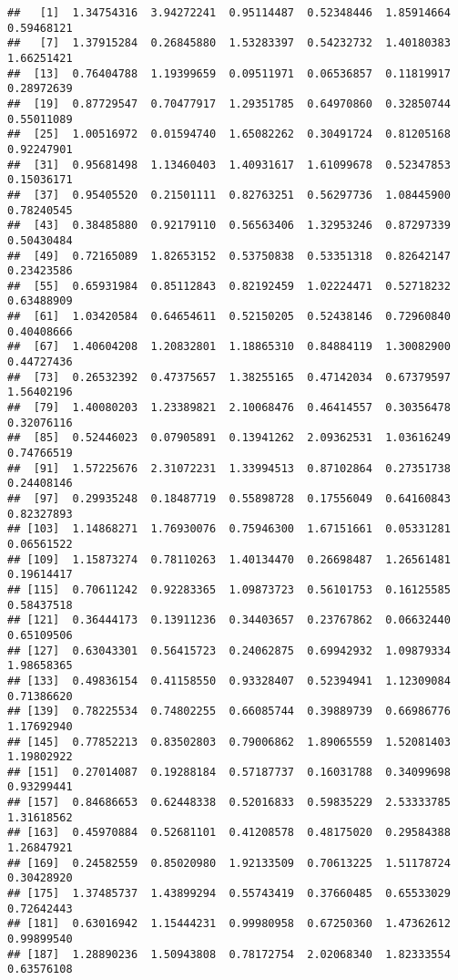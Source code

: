 \documentclass[
]{article}
\begin{document}
\begin{verbatim}
##   [1]  1.34754316  3.94272241  0.95114487  0.52348446  1.85914664  0.59468121
##   [7]  1.37915284  0.26845880  1.53283397  0.54232732  1.40180383  1.66251421
##  [13]  0.76404788  1.19399659  0.09511971  0.06536857  0.11819917  0.28972639
##  [19]  0.87729547  0.70477917  1.29351785  0.64970860  0.32850744  0.55011089
##  [25]  1.00516972  0.01594740  1.65082262  0.30491724  0.81205168  0.92247901
##  [31]  0.95681498  1.13460403  1.40931617  1.61099678  0.52347853  0.15036171
##  [37]  0.95405520  0.21501111  0.82763251  0.56297736  1.08445900  0.78240545
##  [43]  0.38485880  0.92179110  0.56563406  1.32953246  0.87297339  0.50430484
##  [49]  0.72165089  1.82653152  0.53750838  0.53351318  0.82642147  0.23423586
##  [55]  0.65931984  0.85112843  0.82192459  1.02224471  0.52718232  0.63488909
##  [61]  1.03420584  0.64654611  0.52150205  0.52438146  0.72960840  0.40408666
##  [67]  1.40604208  1.20832801  1.18865310  0.84884119  1.30082900  0.44727436
##  [73]  0.26532392  0.47375657  1.38255165  0.47142034  0.67379597  1.56402196
##  [79]  1.40080203  1.23389821  2.10068476  0.46414557  0.30356478  0.32076116
##  [85]  0.52446023  0.07905891  0.13941262  2.09362531  1.03616249  0.74766519
##  [91]  1.57225676  2.31072231  1.33994513  0.87102864  0.27351738  0.24408146
##  [97]  0.29935248  0.18487719  0.55898728  0.17556049  0.64160843  0.82327893
## [103]  1.14868271  1.76930076  0.75946300  1.67151661  0.05331281  0.06561522
## [109]  1.15873274  0.78110263  1.40134470  0.26698487  1.26561481  0.19614417
## [115]  0.70611242  0.92283365  1.09873723  0.56101753  0.16125585  0.58437518
## [121]  0.36444173  0.13911236  0.34403657  0.23767862  0.06632440  0.65109506
## [127]  0.63043301  0.56415723  0.24062875  0.69942932  1.09879334  1.98658365
## [133]  0.49836154  0.41158550  0.93328407  0.52394941  1.12309084  0.71386620
## [139]  0.78225534  0.74802255  0.66085744  0.39889739  0.66986776  1.17692940
## [145]  0.77852213  0.83502803  0.79006862  1.89065559  1.52081403  1.19802922
## [151]  0.27014087  0.19288184  0.57187737  0.16031788  0.34099698  0.93299441
## [157]  0.84686653  0.62448338  0.52016833  0.59835229  2.53333785  1.31618562
## [163]  0.45970884  0.52681101  0.41208578  0.48175020  0.29584388  1.26847921
## [169]  0.24582559  0.85020980  1.92133509  0.70613225  1.51178724  0.30428920
## [175]  1.37485737  1.43899294  0.55743419  0.37660485  0.65533029  0.72642443
## [181]  0.63016942  1.15444231  0.99980958  0.67250360  1.47362612  0.99899540
## [187]  1.28890236  1.50943808  0.78172754  2.02068340  1.82333554  0.63576108

\end{verbatim}
\end{document}
